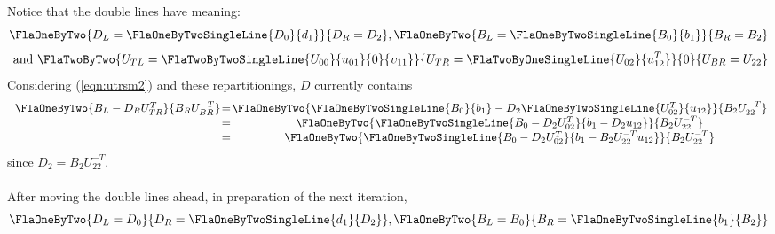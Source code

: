 Notice that the double lines have meaning:
\begin{equation}
\label{eqn:teaml_ltrmm:meaning}
\FlaOneByTwo  { D_L = \FlaOneByTwoSingleLine{ D_0 }
                                            { d_1 } }
              { D_R = D_2 },
%
\FlaOneByTwo  { B_L = \FlaOneByTwoSingleLine{ B_0 }
                                            { b_1 } }
              { B_R = B_2 }
\end{equation}
\[
\mbox{ and }
\FlaTwoByTwo  
              { U_{TL} = \FlaTwoByTwoSingleLine{ U_{00} } { u_{01}        }
                                               {   0    } { \upsilon_{11} } }
              { U_{TR} = \FlaTwoByOneSingleLine{ U_{02}   } 
                                               { u_{12}^T } }
	      { 0 }
              { U_{BR} = U_{22} } 
\]
Considering (\ref{eqn:utrsm2}) and these repartitionings, 
$ D $ currently contains
\begin{eqnarray*}
\begin{array}{c @{\hspace{1pt}} c @{\hspace{1pt}} c @{\hspace{1pt}} c @{\hspace{1pt}} c} 
\FlaOneByTwo{ B_{L} - D_{R} U_{TR}^{T} }
            { B_{R} U_{BR}^{-T}        }
&=& 
\FlaOneByTwo{ \FlaOneByTwoSingleLine{ B_0 }
                                    { b_1 } -
	      D_2
              \FlaOneByTwoSingleLine{ U_{02}^{T} } 
                                    { u_{12}     } }
             { B_{2}U_{22}^{-T} }
 \\
&=&
\FlaOneByTwo{ \FlaOneByTwoSingleLine{ B_0 - D_{2}U_{02}^T }
                                    { b_1 -  D_{2}u_{12}   } }
	    { B_{2}U_{22}^{-T} }\\
&=&
\FlaOneByTwo{ \FlaOneByTwoSingleLine{ B_0 - D_{2}U_{02}^T }
                                    { b_1 -  B_{2}U_{22}^{-T}u_{12}   } }
	    { B_{2}U_{22}^{-T} }\\    
\end{array}
\end{eqnarray*}
since $ D_{2} = B_{2}U_{22}^{-T} $. \\
\\
After moving the double lines ahead, in preparation
of the next iteration, 
\begin{equation}
\label{eqn:teaml_ltrmm:meaning2}
\FlaOneByTwo  { D_L = D_0 }
              { D_R = \FlaOneByTwoSingleLine{ d_1 }
                                            { D_2 } },
\FlaOneByTwo  { B_L = B_0 }
              { B_R = \FlaOneByTwoSingleLine{ b_1 }
                                            { B_2 } }
\end{equation}
